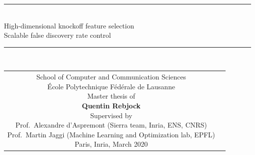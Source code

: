 \begin{titlepage}
\begin{center}
\rule{0.85\textwidth}{2pt}\\[8pt]
{\huge High-dimensional knockoff feature selection}\\[6pt]
{\large Scalable false discovery rate control}\\[2pt]
\rule{0.85\textwidth}{1pt}\\
\vspace{5cm}
\begin{tabular} {cc}
\parbox{0.7\textwidth}{%
	School of Computer and Communication Sciences\\
	École Polytechnique Fédérale de Lausanne\\
	Master thesis of\\[4pt]
	\null \hspace{3em} \textbf{Quentin Rebjock}\\[9pt]
%
\small
Supervised by\\[4pt]
%
    Prof.\ Alexandre d'Aspremont (Sierra team, Inria, ENS, CNRS)\\
    Prof.\ Martin Jaggi (Machine Learning and Optimization lab, EPFL)\\[12pt]
%
Paris, Inria, March 2020}
\end{tabular}

\end{center}
\end{titlepage}

\restoregeometry
